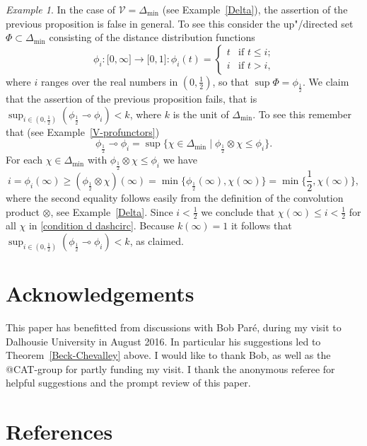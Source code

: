 \documentclass[preprint, a4paper]{elsarticle}
\newcommand{\dashcirc}{\multimap}
\theoremstyle{definition}
\theoremstyle{remark}
\newtheorem{example}[theorem]{Example}
\providecommand{\exref}[1]{Example~\ref{#1}}
\providecommand{\thmref}[1]{Theorem~\ref{#1}}
\providecommand{\tens}{\otimes}
\providecommand{\brcs}[1]{\lbrace #1 \rbrace}
\providecommand{\bigbrcs}[1]{\bigl\lbrace #1 \bigr\rbrace}
\providecommand{\brks}[1]{\lbrack #1 \rbrack}
\providecommand{\set}[1]{\brcs{#1}}
\providecommand{\map}[3]{#1\colon#2\to#3}
\providecommand{\catvar}[1]{\mathcal{#1}}
\providecommand{\2}{\mathsf 2}
\providecommand{\V}{\catvar V}
\begin{document}
	\begin{example} \label{counter example condition d}
		In the case of $\V = \Delta_{\min}$ (see \exref{Delta}), the assertion of the previous proposition is false in general. To see this consider the up"/directed set $\Phi \subset \Delta_{\min}$ consisting of the distance distribution functions
		\begin{displaymath}
			\map{\phi_i}{\brks{0, \infty}}{\brks{0, 1}}\colon \phi_i(t) = \begin{cases}
				t & \text{if $t \leq i$;} \\
				i & \text{if $t > i$,}
			\end{cases}
		\end{displaymath}
		where $i$ ranges over the real numbers in $(0, \frac12)$, so that $\sup \Phi = \phi_{\frac 12}$. We claim that the assertion of the previous proposition fails, that is $\sup_{i \in (0, \frac 12)} (\phi_{\frac 12} \dashcirc \phi_i) < k$, where $k$ is the unit of $\Delta_{\min}$. To see this remember that (see \exref{V-profunctors})
		\begin{equation} \label{condition d dashcirc}
			\phi_{\frac 12} \dashcirc \phi_i = \sup\set{\chi \in \Delta_{\min} \mid \phi_{\frac 12} \tens \chi \leq \phi_i}.
		\end{equation}
		For each $\chi \in \Delta_{\min}$ with $\phi_{\frac 12} \tens \chi \leq \phi_i$ we have
		\begin{displaymath}
			i = \phi_i(\infty) \geq (\phi_{\frac 12} \tens \chi)(\infty) = \min\bigbrcs{\phi_{\frac 12}(\infty), \chi(\infty)} = \min\bigbrcs{\textstyle\frac 12, \chi(\infty)},
		\end{displaymath}
		where the second equality follows easily from the definition of the convolution product $\tens$, see \exref{Delta}. Since $i < \frac 12$ we conclude that $\chi(\infty) \leq i < \frac 12$ for all $\chi$ in \eqref{condition d dashcirc}. Because $k(\infty) = 1$ it follows that $\sup_{i \in (0, \frac 12)} (\phi_{\frac 12} \dashcirc \phi_i) < k$, as claimed.
	\end{example}
	
	\section*{Acknowledgements} 
	This paper has benefitted from discussions with Bob Par\'e, during my visit to Dalhousie University in August 2016. In particular his suggestions led to \thmref{Beck-Chevalley} above. I would like to thank Bob, as well as the @CAT-group for partly funding my visit. I thank the anonymous referee for helpful suggestions and the prompt review of this paper.
	
	\section*{References}
  
	
\end{document}
